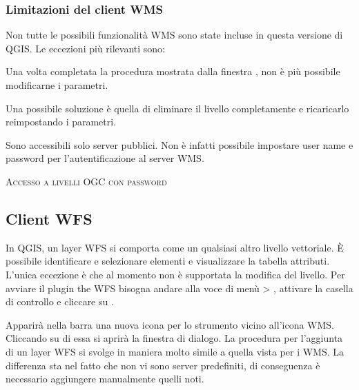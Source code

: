 \subsubsection{Limitazioni del client WMS}\label{sec:ogc-wms-limits}

Non tutte le possibili funzionalità WMS sono state incluse in questa versione di QGIS. Le eccezioni
più rilevanti sono:


Una volta completata la procedura mostrata dalla finestra
, non è più possibile
modificarne i parametri.

Una possibile soluzione è quella di eliminare il livello completamente e
ricaricarlo reimpostando i parametri.


Sono accessibili solo server pubblici. Non è infatti possibile impostare user
name e password per l'autentificazione al server WMS.

\begin{Tip}[ht]\caption{\textsc{Accesso a livelli OGC con password}}
\end{Tip}


\subsection{Client WFS}

In QGIS, un layer WFS si comporta come un qualsiasi altro livello vettoriale.
È possibile identificare e selezionare elementi e visualizzare la tabella
attributi. L'unica eccezione è che al momento non è supportata la modifica del
livello. Per avviare il plugin the WFS bisogna andare alla voce di menù
 > , attivare la casella di controllo  e cliccare su . 

Apparirà nella barra una nuova icona per lo strumento
 vicino all'icona WMS.
Cliccando su di essa si aprirà la finestra di dialogo. La procedura per l'aggiunta di un layer
WFS si svolge in maniera molto simile a quella vista per i WMS. La differenza
sta nel fatto che non vi sono server predefiniti, di conseguenza è necessario
aggiungere manualmente quelli noti.

